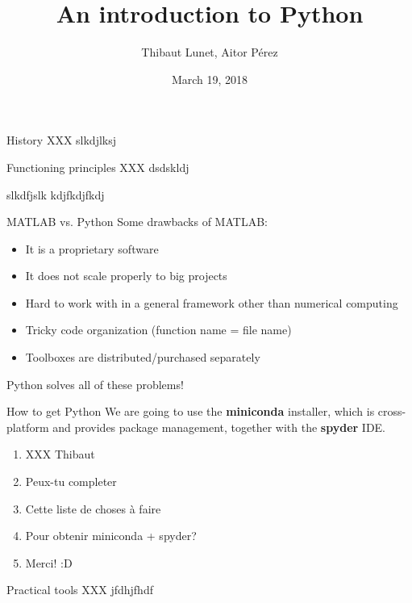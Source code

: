 \documentclass{beamer}
\title{An introduction to Python}
\author{Thibaut Lunet, Aitor Pérez}
\date{March 19, 2018}
\begin{document}
	\maketitle
	
	\begin{frame}{History}
		XXX slkdjlksj
	\end{frame}

	\begin{frame}{Functioning principles}
		XXX dsdskldj
		
		
		\begin{block}{slkdfjslk}
			kdjfkdjfkdj
		\end{block}
	\end{frame}


	\begin{frame}{MATLAB vs. Python}
		Some drawbacks of MATLAB:
		\begin{itemize}
			\item It is a proprietary software
			\item It does not scale properly to big projects
			\item Hard to work with in a general framework other than numerical computing
			\item Tricky code organization (function name = file name)
			\item Toolboxes are distributed/purchased separately
		\end{itemize}
	
		\vspace{10pt}
	
		Python solves all of these problems!
	\end{frame}

	\begin{frame}{How to get Python}
		We are going to use the \textbf{miniconda} installer, which is cross-platform and provides package management, together with the \textbf{spyder} IDE.
		
		\begin{enumerate}
			\item XXX Thibaut
			\item Peux-tu completer
			\item Cette liste de choses à faire
			\item Pour obtenir miniconda + spyder?
			\item Merci! :D
		\end{enumerate}
	\end{frame}

	\begin{frame}{Practical tools}
		XXX jfdhjfhdf
	\end{frame}
\end{document}
